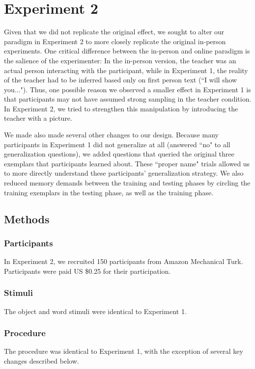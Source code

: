 \documentclass[man]{apa2}
\begin{document}
\section{Experiment 2}

Given that we did not replicate the original effect,  we sought to alter our paradigm in Experiment 2 to more closely replicate the original in-person experiments. One critical difference between the in-person and online paradigm is the salience of the experimenter: In the in-person version, the teacher was an actual person interacting with the participant, while in Experiment 1, the reality of the teacher had to be inferred based only on first person text (``I will show you..."). Thus, one possible reason we observed a smaller effect  in Experiment 1 is that  participants may not have assumed strong sampling in the teacher condition. In Experiment 2, we tried to strengthen this manipulation by introducing the teacher with a picture.

We made also made several other changes to our design. Because many participants in Experiment 1 did not generalize at all (answered ``no" to all generalization questions), we added questions that queried the original three exemplars that participants  learned about. These ``proper name" trials allowed us to more directly understand these participants' generalization strategy. We also reduced memory demands between the training and testing phases by circling the training exemplars in the testing phase, as well as the training phase.

\subsection{Methods}

\subsubsection{Participants} In Experiment 2, we recruited 150 participants from Amazon Mechanical Turk. Participants were paid US \$0.25 for their participation.

\subsubsection{Stimuli}
The object and word stimuli were identical to Experiment 1.

\subsubsection{Procedure}
The procedure was identical to Experiment 1, with the exception of several key changes described below.
\end{document}
